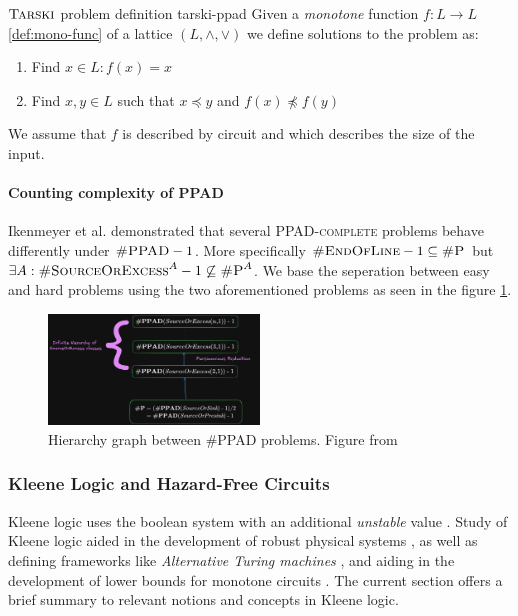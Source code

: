 \begin{definitionbox}{$\textnormal{\textsc{Tarski}}$ problem definition \cite{fearnley_FasterAlgorithmFinding_2022}}{tarski-ppad}
    Given a \textit{monotone} function $f: L \to L$ \ref{def:mono-func} of a lattice $(L, \wedge, \vee)$
    we define solutions to the problem as:
    \begin{enumerate}
        \item Find $x \in L: f(x) = x$
        \item Find $x,y \in L$ such that $x \preceq y$ and $f(x) \not\preceq f(y)$
    \end{enumerate}
    We assume that $f$ is described by circuit and which describes the size of the input.
\end{definitionbox}
%
\paragraph{Counting complexity of PPAD}


Ikenmeyer et al. \cite{ikenmeyer_WhatWhatNot_2022} demonstrated that several \textsc{PPAD-complete}
problems behave differently under $\textsc{\#PPAD} -1$. More specifically
$\textsc{\#EndOfLine} - 1 \subseteq \textsc{\#P}$ but $\exists A: \textsc{\#SourceOrExcess}^A  - 1\not\subseteq \textsc{\#P}^A$.
We base the seperation between easy and hard problems using the two aforementioned problems as seen in the figure \ref{fig:ppad-count-hier}.

\begin{figure}[h!]
    \centering
    \includegraphics[width=0.5\textwidth]{assets/chart-plot.png}
    \caption{Hierarchy graph between \textsc{\#PPAD} problems. Figure from \cite{ikenmeyer_WhatWhatNot_2022}}\label{fig:ppad-count-hier}
\end{figure}


\subsubsection{Kleene Logic and Hazard-Free Circuits}

Kleene logic uses the boolean system with an additional \textit{unstable} value \cite{kleene_IntroductionMetamathematics_2009}. 
Study of Kleene logic aided in
the development of robust physical systems \cite{friedrichs_MetastabilityContainingCircuits_2018}, as well as
defining frameworks like \textit{Alternative Turing machines} \cite{kozen_TheoryComputation_2006}, and
aiding in the development of lower bounds for monotone circuits
\cite{eichelberger_HazardDetectionCombinational_1965, ikenmeyer_ComplexityHazardfreeCircuits_2019,ikenmeyer_KarchmerWigdersonGamesHazardfree_2022,  bund_SmallHazardFreeTransducers_2025}. 
The current section offers a brief summary to relevant notions and concepts in Kleene logic.

